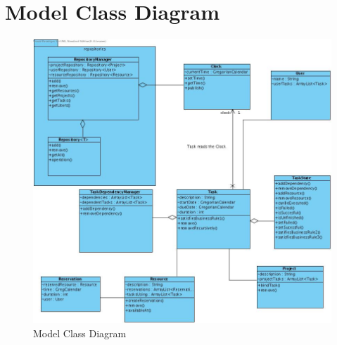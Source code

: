 	\section{Model Class Diagram}
	\begin{figure}[H]
		\begin{center}
			\includegraphics[width=\textwidth]{images/ModelClassDiagram.jpg}
		\end{center}
		\caption{Model Class Diagram}
	\end{figure}
	

